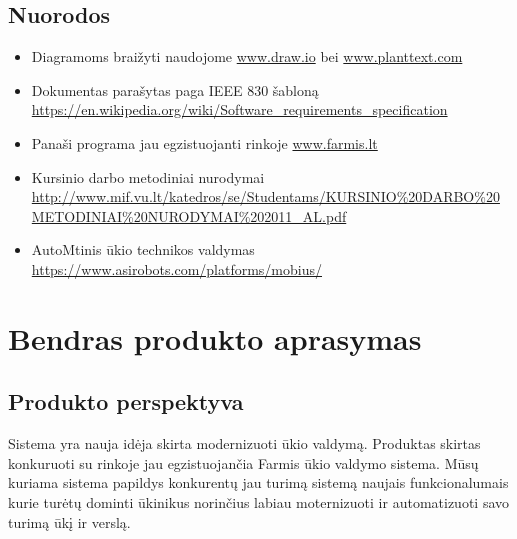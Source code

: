 \documentclass[oneside]{VUMIFPSkursinis}
\begin{document}
\subsection{Nuorodos}
\begin{itemize}
	\item Diagramoms braižyti naudojome \url{www.draw.io} bei \url{www.planttext.com}
	\item Dokumentas parašytas paga IEEE 830 šabloną \url{https://en.wikipedia.org/wiki/Software_requirements_specification}
	\item Panaši programa jau egzistuojanti rinkoje \url{www.farmis.lt}
	\item Kursinio darbo metodiniai nurodymai \url{http://www.mif.vu.lt/katedros/se/Studentams/KURSINIO%20DARBO%20METODINIAI%20NURODYMAI%202011_AL.pdf}
	\item AutoMtinis ūkio technikos valdymas \url{https://www.asirobots.com/platforms/mobius/}
\end{itemize}

\section{Bendras produkto aprasymas}
\subsection{Produkto perspektyva}
Sistema yra nauja idėja skirta modernizuoti ūkio valdymą. Produktas skirtas konkuruoti su rinkoje jau egzistuojančia Farmis ūkio valdymo sistema. Mūsų kuriama sistema papildys konkurentų jau turimą sistemą naujais funkcionalumais kurie turėtų dominti ūkinikus norinčius labiau moternizuoti ir automatizuoti savo turimą ūkį ir verslą. 
\end{document}
